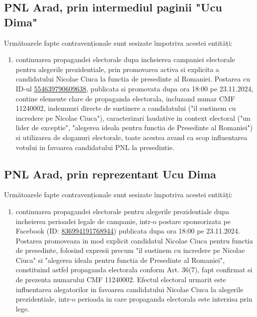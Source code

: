 \documentclass[a4paper,12pt]{article}
\begin{document}
\vspace{0.5cm}

\subsection{PNL Arad, prin intermediul paginii "Ucu Dima"}
Următoarele fapte contravenționale sunt sesizate împotriva acestei entități:

\begin{enumerate}[leftmargin=*, label=\arabic*.)]
    \item continuarea propagandei electorale dupa incheierea campaniei electorale pentru alegerile prezidentiale, prin promovarea activa si explicita a candidatului Nicolae Ciuca la functia de presedinte al Romaniei. Postarea cu ID-ul \href{https://www.facebook.com/ads/library/?id=554639790609638}{554639790609638}, publicata si promovata dupa ora 18:00 pe 23.11.2024, contine elemente clare de propaganda electorala, incluzand numar CMF 11240002, indemnuri directe de sustinere a candidatului ("il sustinem cu incredere pe Nicolae Ciuca"), caracterizari laudative in context electoral ("un lider de exceptie", "alegerea ideala pentru functia de Presedinte al Romaniei") si utilizarea de sloganuri electorale, toate acestea avand ca scop influentarea votului in favoarea candidatului PNL la presedintie.
\end{enumerate}

\vspace{0.5cm}

\subsection{PNL Arad, prin reprezentant Ucu Dima}
Următoarele fapte contravenționale sunt sesizate împotriva acestei entități:

\begin{enumerate}[leftmargin=*, label=\arabic*.)]
    \item continuarea propagandei electorale pentru alegerile prezidentiale dupa incheierea perioadei legale de campanie, intr-o postare sponsorizata pe Facebook (ID: \href{https://www.facebook.com/ads/library/?id=836994191768944}{836994191768944}) publicata dupa ora 18:00 pe 23.11.2024. Postarea promoveaza in mod explicit candidatul Nicolae Ciuca pentru functia de presedinte, folosind expresii precum "il sustinem cu incredere pe Nicolae Ciuca" si "alegerea ideala pentru functia de Presedinte al Romaniei", constituind astfel propaganda electorala conform Art. 36(7), fapt confirmat si de prezenta numarului CMF 11240002. Efectul electoral urmarit este influentarea alegatorilor in favoarea candidatului Nicolae Ciuca la alegerile prezidentiale, intr-o perioada in care propaganda electorala este interzisa prin lege.
\end{enumerate}
\end{document}
